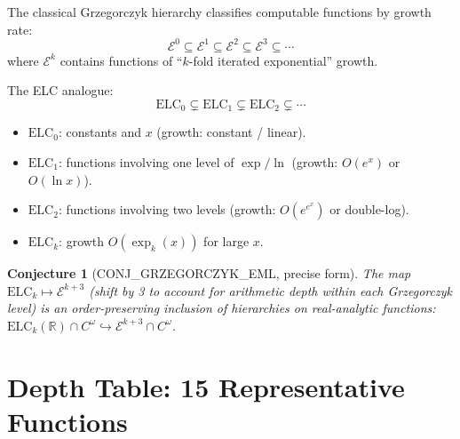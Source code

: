 \documentclass[11pt]{article}
\newtheorem{conjecture}[theorem]{Conjecture}
\begin{document}
The classical Grzegorczyk hierarchy classifies computable functions by growth rate:
\[
  \mathcal{E}^0 \subseteq \mathcal{E}^1 \subseteq \mathcal{E}^2 \subseteq \mathcal{E}^3 \subseteq \cdots
\]
where $\mathcal{E}^k$ contains functions of ``$k$-fold iterated exponential'' growth.

The ELC analogue:
\[
  \mathrm{ELC}_0 \subsetneq \mathrm{ELC}_1 \subsetneq \mathrm{ELC}_2 \subsetneq \cdots
\]
\begin{itemize}
  \item $\mathrm{ELC}_0$: constants and $x$ (growth: constant / linear).
  \item $\mathrm{ELC}_1$: functions involving one level of $\exp/\ln$ (growth: $O(e^x)$ or $O(\ln x)$).
  \item $\mathrm{ELC}_2$: functions involving two levels (growth: $O(e^{e^x})$ or double-log).
  \item $\mathrm{ELC}_k$: growth $O(\exp_k(x))$ for large $x$.
\end{itemize}

\begin{conjecture}[CONJ\_GRZEGORCZYK\_EML, precise form]
The map $\mathrm{ELC}_k \mapsto \mathcal{E}^{k+3}$ (shift by 3 to account for
arithmetic depth within each Grzegorczyk level) is an order-preserving
inclusion of hierarchies on real-analytic functions:
$\mathrm{ELC}_k(\mathbb{R}) \cap C^\omega \hookrightarrow \mathcal{E}^{k+3} \cap C^\omega$.
\end{conjecture}

\section{Depth Table: 15 Representative Functions}
\label{sec:table}
\end{document}
